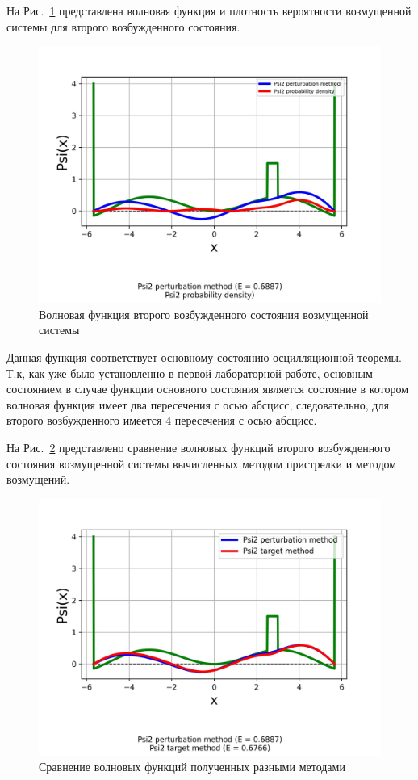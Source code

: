На Рис.~\ref{fig:State2PB} представлена волновая функция и плотность вероятности возмущенной системы для второго возбужденного состояния.


\begin{figure}[H]
\centering
    \includegraphics[width=0.75\linewidth]{State2 probability density}
    \caption{Волновая функция второго возбужденного состояния возмущенной системы}\label{fig:State2PB}
\end{figure}

Данная функция соответствует основному состоянию осцилляционной теоремы.
Т.к, как уже было установленно в первой лабораторной работе,
основным состоянием в случае функции основного состояния является состояние в котором волновая функция имеет два пересечения с осью абсцисс,
следовательно, для второго возбужденного имеется 4 пересечения с осью абсцисс.


На Рис.~\ref{fig:State2} представлено сравнение волновых функций второго возбужденного состояния возмущенной системы вычисленных методом пристрелки и методом возмущений.


\begin{figure}[H]
\centering
    \includegraphics[width=0.75\linewidth]{State2}
    \caption{Сравнение волновых функций полученных разными методами}\label{fig:State2}
\end{figure}


